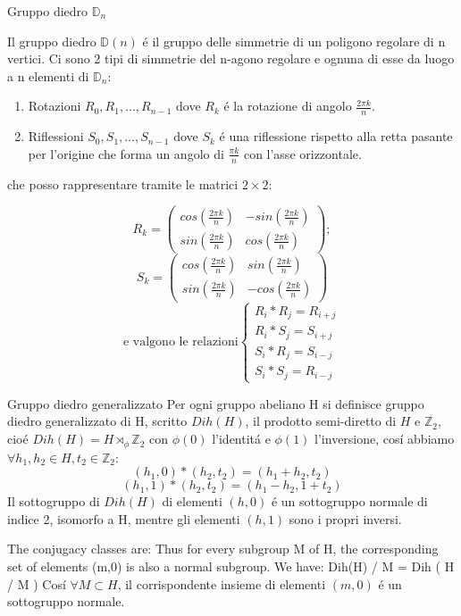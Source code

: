 \documentclass[oneside,12pt]{memoir}
\begin{document}
\begin{definition}{Gruppo diedro $\mathbb{D}_n$}

Il gruppo diedro $\mathbb{D}(n)$ \'e il gruppo delle simmetrie di un poligono regolare di n vertici.
Ci sono 2 tipi di simmetrie del	 n-agono regolare e ognuna di esse da luogo a n elementi di $\mathbb{D}_n$:
\begin{enumerate}
\item Rotazioni $R_0,R_1,\ldots ,R_{n-1}$ dove $R_k$ \'e la rotazione di angolo $\frac{2\pi k}{n}$.
\item Riflessioni $S_0,S_1, \ldots ,S_{n-1}$ dove $S_k$ \'e una riflessione rispetto alla retta pasante per l'origine che forma un angolo di $\frac{\pi k}{n}$ con l'asse orizzontale.
\end{enumerate}
che posso rappresentare tramite le matrici $2\times2$:

\[
R_k=\left(
\begin{array}{cc}
cos(\frac{2\pi k}{n}) & -sin(\frac{2\pi k}{n}) \\
sin(\frac{2\pi k}{n}) & cos(\frac{2\pi k}{n})
\end{array}
\right); 
\]
\[
S_k=\left(
\begin{array}{cc}
cos(\frac{2\pi k}{n}) & sin(\frac{2\pi k}{n}) \\
sin(\frac{2\pi k}{n}) & -cos(\frac{2\pi k}{n})
\end{array}
\right)
\]
\[
\text{e valgono le relazioni}
\left\{
\begin{array}{c}
R_i*R_j=R_{i+j} \\
R_i*S_j=S_{i+j} \\
S_i*R_j=S_{i-j} \\
S_i*S_j=R_{i-j} 
\end{array}
\right.
\]
\end{definition}


\begin{definition}{Gruppo diedro generalizzato}
Per ogni gruppo abeliano H si definisce gruppo diedro generalizzato di H, scritto $Dih(H)$, il prodotto semi-diretto  di $H$ e $\mathbb{Z}_2$, cio\'e $Dih(H)=H\rtimes_\phi \mathbb{Z}_2$ con $\phi(0)$ l'identit\'a e $\phi(1)$ l'inversione, cos\'i abbiamo $\forall h_1,h_2 \in H, t_2 \in \mathbb{Z}_2$:
\[ (h_1,0)*(h_2,t_2)=(h_1+h_2,t_2)\]
\[ (h_1,1)*(h_2,t_2)=(h_1-h_2,1+t_2)\]
Il sottogruppo di $Dih(H)$ di elementi $(h,0)$ \'e un sottogruppo normale di indice 2, isomorfo a H, mentre gli elementi $(h,1)$ sono i propri inversi.

The conjugacy classes are:
Thus for every subgroup M of H, the corresponding set of elements (m,0) is also a normal subgroup. We have:
Dih(H) / M = Dih ( H / M )
Cos\'i $\forall M\subset H$, il corrispondente insieme di elementi $(m,0)$ \'e un sottogruppo normale.

\end{definition}
\end{document}
